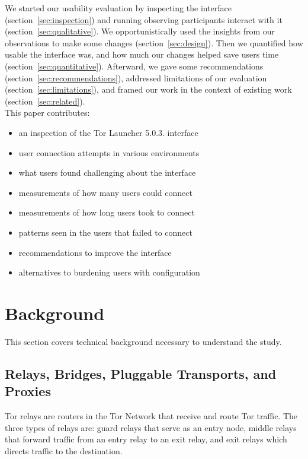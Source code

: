 \documentclass[USenglish,oneside,twocolumn]{article}
\begin{document}
We started our usability evaluation by inspecting the interface (section~\ref{sec:inspection}) and
running observing participants interact with it (section~\ref{sec:qualitative}). 
We opportunistically used the insights from our observations to make some changes (section~\ref{sec:design}).
Then we quantified how usable the interface was, and 
how much our changes helped save users time (section~\ref{sec:quantitative}).
Afterward, we gave some recommendations (section~\ref{sec:recommendations}), addressed
limitations of our evaluation (section~\ref{sec:limitations}), and framed our work in the context of existing work (section~\ref{sec:related}). \\

\noindent This paper contributes:
\smallskip
\begin{itemize}
\item an inspection of the Tor Launcher 5.0.3. interface
\item user connection attempts in various environments
\item what users found challenging about the interface
\item measurements of how many users could connect
\item measurements of how long users took to connect
\item patterns seen in the users that failed to connect
\item recommendations to improve the interface
\item alternatives to burdening users with configuration 
\end{itemize}

\section{Background}
\label{sec:background}
This section covers technical background necessary to understand the study. 

\subsection{Relays, Bridges, Pluggable Transports, and Proxies} 

Tor relays are routers in the Tor Network that receive and route Tor traffic. 
The three types of relays are: guard relays that serve as an entry node, middle relays that forward traffic from an entry relay to an exit relay, and exit relays which directs traffic to the destination. 
\end{document}

